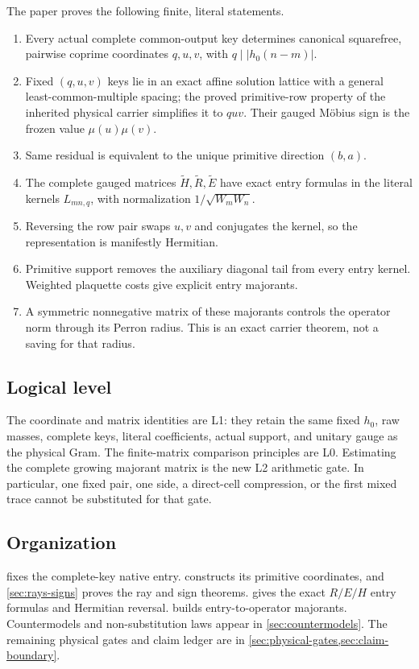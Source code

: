 The paper proves the following finite, literal statements.
\begin{enumerate}[label=\textup{(\arabic*)},leftmargin=3em]
 \item Every actual complete common-output key determines canonical
       squarefree, pairwise coprime coordinates \(q,u,v\), with
       \(q\mid|h_0(n-m)|\).
 \item Fixed \((q,u,v)\) keys lie in an exact affine solution lattice
       with a general least-common-multiple spacing; the proved
       primitive-row property of the inherited physical carrier
       simplifies it to \(quv\).
       Their gauged M\"obius sign is the frozen value
       \(\mu(u)\mu(v)\).
 \item Same residual is equivalent to the unique primitive direction
       \((b,a)\).
 \item The complete gauged matrices \(\widetilde H,\widetilde R,\widetilde
       E\) have exact entry formulas in the literal kernels
       \(L_{mn,q}\), with normalization \(1/\sqrt{W_mW_n}\).
 \item Reversing the row pair swaps \(u,v\) and conjugates the kernel, so
       the representation is manifestly Hermitian.
 \item Primitive support removes the auxiliary diagonal tail from every
       entry kernel.  Weighted plaquette costs give explicit entry
       majorants.
 \item A symmetric nonnegative matrix of these majorants controls the
       operator norm through its Perron radius.  This is an exact carrier
       theorem, not a saving for that radius.
\end{enumerate}

\subsection{Logical level}

The coordinate and matrix identities are L1: they retain the same fixed
\(h_0\), raw masses, complete keys, literal coefficients, actual support,
and unitary gauge as the physical Gram.  The finite-matrix comparison
principles are L0.  Estimating the complete growing majorant matrix is the
new L2 arithmetic gate.  In particular, one fixed pair, one side, a
direct-cell compression, or the first mixed trace cannot be substituted
for that gate.

\subsection{Organization}

 fixes the complete-key native entry.
 constructs its primitive coordinates,
and \cref{sec:rays-signs} proves the ray and sign theorems.
 gives the exact \(R/E/H\) entry formulas
and Hermitian reversal.   builds
entry-to-operator majorants.  Countermodels and non-substitution laws
appear in \cref{sec:countermodels}.  The remaining physical gates and
claim ledger are in \cref{sec:physical-gates,sec:claim-boundary}.
